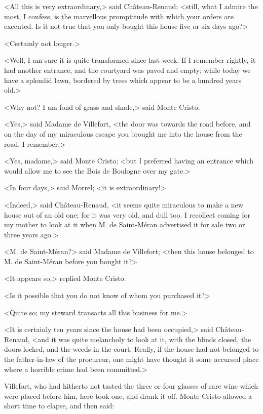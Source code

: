  <All this is very extraordinary,> said Château-Renaud; <still, what I admire the most, I confess, is the marvellous promptitude with which your orders are executed. Is it not true that you only bought this house five or six days ago?> 

 <Certainly not longer.> 

 <Well, I am sure it is quite transformed since last week. If I remember rightly, it had another entrance, and the courtyard was paved and empty; while today we have a splendid lawn, bordered by trees which appear to be a hundred years old.> 

 <Why not? I am fond of grass and shade,> said Monte Cristo. 

 <Yes,> said Madame de Villefort, <the door was towards the road before, and on the day of my miraculous escape you brought me into the house from the road, I remember.> 

 <Yes, madame,> said Monte Cristo; <but I preferred having an entrance which would allow me to see the Bois de Boulogne over my gate.> 

 <In four days,> said Morrel; <it is extraordinary!> 

 <Indeed,> said Château-Renaud, <it seems quite miraculous to make a new house out of an old one; for it was very old, and dull too. I recollect coming for my mother to look at it when M. de Saint-Méran advertised it for sale two or three years ago.> 

 <M. de Saint-Méran?> said Madame de Villefort; <then this house belonged to M. de Saint-Méran before you bought it?> 

 <It appears so,> replied Monte Cristo. 

 <Is it possible that you do not know of whom you purchased it?> 

 <Quite so; my steward transacts all this business for me.> 

 <It is certainly ten years since the house had been occupied,> said Château-Renaud, <and it was quite melancholy to look at it, with the blinds closed, the doors locked, and the weeds in the court. Really, if the house had not belonged to the father-in-law of the procureur, one might have thought it some accursed place where a horrible crime had been committed.> 

 Villefort, who had hitherto not tasted the three or four glasses of rare wine which were placed before him, here took one, and drank it off. Monte Cristo allowed a short time to elapse, and then said: 

